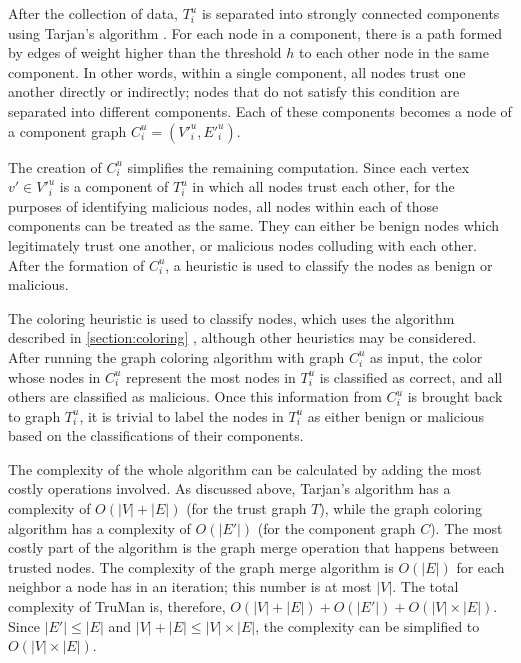 \documentclass[conference]{IEEEtran}
\begin{document}
After the collection of data, $T^u_i$ is separated into strongly connected components using Tarjan's algorithm \cite{tarjan1972depth}.
For each node in a component, there is a path formed by edges of weight higher than the threshold $h$ to each other node in the same component.
In other words, within a single component, all nodes trust one another directly or indirectly; nodes that do not satisfy this condition are separated into different components.
Each of these components becomes a node of a component graph $C^u_i = (V'^u_i, E'^u_i)$.

The creation of $C^u_i$ simplifies the remaining computation.
Since each vertex $v' \in V'^u_i$ is a component of $T^u_i$ in which all nodes trust each other, for the purposes of identifying malicious nodes, all nodes within each of those components can be treated as the same.
They can either be benign nodes which legitimately trust one another, or malicious nodes colluding with each other.
After the formation of $C^u_i$, a heuristic is used to classify the nodes as benign or malicious.


The coloring heuristic is used to classify nodes, which uses the algorithm described in \autoref{section:coloring} \cite{mittal2011graph}, although other heuristics may be considered.
After running the graph coloring algorithm with graph $C^u_i$ as input, the color whose nodes in $C^u_i$ represent the most nodes in $T^u_i$ is classified as correct, and all others are classified as malicious.
Once this information from $C^u_i$ is brought back to graph $T^u_i$, it is trivial to label the nodes in $T^u_i$ as either benign or malicious based on the classifications of their components.


The complexity of the whole algorithm can be calculated by adding the most costly operations involved.
As discussed above, Tarjan's algorithm has a complexity of $O(|V|+|E|)$ (for the trust graph $T$), while the graph coloring algorithm has a complexity of $O(|E'|)$ (for the component graph $C$).
The most costly part of the algorithm is the graph merge operation that happens between trusted nodes.
The complexity of the graph merge algorithm is $O(|E|)$ for each neighbor a node has in an iteration; this number is at most $|V|$.
The total complexity of TruMan is, therefore, $O(|V|+|E|)+O(|E'|)+O(|V|\times |E|)$.
Since $|E'| \leq |E|$ and $|V|+|E| \leq |V|\times |E|$, the complexity can be simplified to $O(|V| \times |E|)$.
\end{document}
